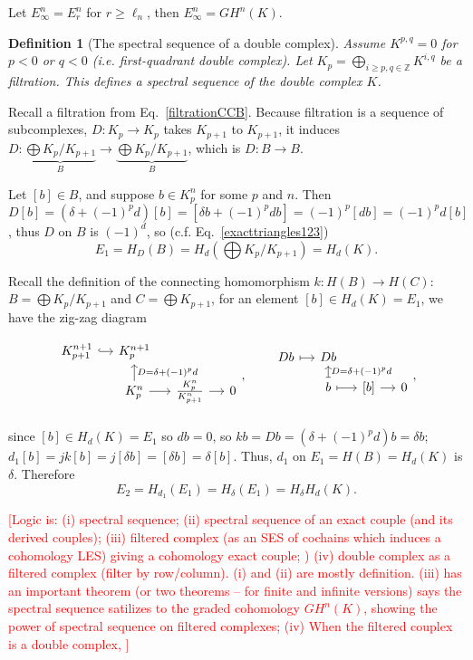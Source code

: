 \documentclass{article}
\theoremstyle{mystyle}
\newtheorem*{definition}{Definition}%
\theoremstyle{remark}
\numberwithin{equation}{section}
\begin{document}
Let $E^n_\infty = E^n_r$ for $r\geq \ell_n$, then $E^n_\infty = GH^n(K)$. 

\begin{definition}[The spectral sequence of a double complex]
Assume $K^{p,q}=0$ for $p<0$ or $q<0$ (i.e. first-quadrant double complex). Let $K_p = \bigoplus_{i\geq p,q\in \mathbb{Z}} K^{i,q}$ be a filtration. This defines a spectral sequence of the double complex $K$.
\end{definition}

Recall a filtration from Eq.~\eqref{filtrationCCB}. Because filtration is a sequence of subcomplexes, $D\colon K_p\rightarrow K_p$ takes $K_{p+1}$ to $K_{p+1}$, it induces $D\colon \underbrace{\bigoplus  K_p/K_{p+1}}_{B} \rightarrow \underbrace{\bigoplus  K_p/K_{p+1}}_B$, which is $D\colon B\rightarrow B$.  

Let $[b]\in B$, and suppose $b \in K^n_p$ for some $p$ and $n$. Then $D[b] = (\delta+(-1)^pd)[b] = [\delta b + (-1)^p d b] = (-1)^p[db] = (-1)^p d[b]$, thus $D$ on $B$ is $(-1)^d$, so (c.f. Eq.~\eqref{exacttriangles123}) 
$$E_1 = H_D(B) = H_d(\bigoplus K_p/K_{p+1}) = H_d(K).$$

Recall the definition of the connecting homomorphism $k\colon H(B)\rightarrow H(C)$: $B = \bigoplus K_p/K_{p+1}$ and $C = \bigoplus K_{p+1}$, for an element $[b]\in H_d(K)=E_1$, we have the zig-zag diagram

\begin{equation}\label{bchaseDb}
\begin{tikzcd}[row sep = small,column sep = small]
K^{n+1}_{p+1} \ar[r,hook] & K^{n+1}_p &&\\
&K^n_p \ar[u,"D=\delta+(-1)^pd"'] \ar[r] & \frac{K^n_p}{K^n_{p+1}} \ar[r] &0\\
\end{tikzcd},\qquad
\begin{tikzcd}[row sep = small,column sep = small]
Db \ar[r,mapsto] & Db &&\\
&b \ar[u,mapsto, "D=\delta+(-1)^pd"'] \ar[r,mapsto] & {[b]} \ar[r] &0\\
\end{tikzcd},
\end{equation}
since $[b]\in H_d(K)=E_1$ so $db=0$, so $kb = Db = (\delta+(-1)^pd)b = \delta b$; $d_1[b] = jk[b] = j[\delta b] = [\delta b] = \delta[b]$.
Thus, $d_1$ on $E_1=H(B) = H_d(K)$ is $\delta$. 
Therefore 
$$E_2 = H_{d_1}(E_1) = H_\delta(E_1) = H_\delta H_d(K).$$


\textcolor{red}{[Logic is: (i) spectral sequence; (ii) spectral sequence of an exact couple (and its derived couples); (iii) filtered complex (as an SES of cochains which induces a cohomology LES) giving a cohomology exact couple; ) (iv) double complex as a filtered complex (filter by row/column).  (i) and (ii) are mostly definition. (iii) has an important theorem (or two theorems -- for finite and infinite versions) says the spectral sequence satilizes to the graded cohomology $GH^n(K)$, showing the power of spectral sequence on filtered complexes; (iv) When the filtered couplex is a double complex, ]}
\end{document}
